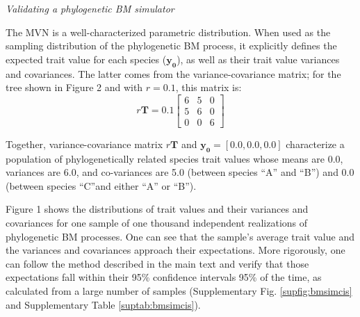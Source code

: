 \documentclass[oneside]{article}
\begin{document}
\begin{tcolorbox}[breakable, width=\textwidth, colback=gray!10, boxrule=0pt,
  title=Box 1: Models characterized by well-known parametric distributions, fonttitle=\bfseries]
\emph{Validating a phylogenetic BM simulator}

The MVN is a well-characterized parametric distribution.
When used as the sampling distribution of the phylogenetic BM process, it explicitly defines the expected trait value for each species ($\boldsymbol{y_0}$), as well as their trait value variances and covariances.
The latter comes from the variance-covariance matrix; for the tree shown in Figure 2 and with $r = 0.1$, this matrix
is:
\begin{equation}
  r\boldsymbol{T} = 0.1
  \begin{bmatrix}
    6 & 5 & 0\\
    5 & 6 & 0\\
    0 & 0 & 6
  \end{bmatrix}
  \label{eq:mat}
\end{equation}

Together, variance-covariance matrix $r\boldsymbol{T}$ and $\boldsymbol{y_0} = [0.0, 0.0, 0.0]$ characterize a population of phylogenetically related species trait values whose means are 0.0, variances are 6.0, and co-variances are 5.0 (between species ``A'' and ``B'') and 0.0 (between species ``C''and either ``A'' or ``B'').

\vspace{.25cm}

Figure 1 shows the distributions of trait values and their variances and covariances for one sample of one thousand independent realizations of phylogenetic BM processes. 
One can see that the sample's average trait value and the variances and covariances approach their expectations. 
More rigorously, one can follow the method described in the main text and verify that those expectations fall within their 95\% confidence intervals 95\% of the time, as calculated from a large number of samples (Supplementary Fig. \ref{supfig:bmsimcis} and Supplementary Table \ref{suptab:bmsimcis}).

\end{tcolorbox}
\end{document}
